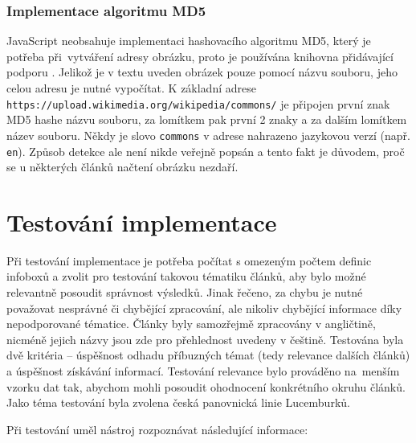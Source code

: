 \subsection{Implementace algoritmu MD5}
JavaScript neobsahuje implementaci hashovacího algoritmu MD5, který je potřeba při~vytváření adresy obrázku, proto je používána knihovna přidávající podporu \cite{md5} \cite{imageurl}. Jelikož je v textu uveden obrázek pouze pomocí názvu souboru, jeho celou adresu je nutné vypočítat. K základní adrese \texttt{https://upload.wikimedia.org/wikipedia/commons/} je připojen první znak MD5 hashe názvu souboru, za lomítkem pak první 2 znaky a za dalším lomítkem název souboru. Někdy je slovo \texttt{commons} v adrese nahrazeno jazykovou verzí (např. \texttt{en}). Způsob detekce ale není nikde veřejně popsán a tento fakt je důvodem, proč se u některých článků načtení obrázku nezdaří.

\chapter{Testování implementace}
Při testování implementace je potřeba počítat s omezeným počtem definic infoboxů a zvolit pro testování takovou tématiku článků, aby bylo možné relevantně posoudit správnost výsledků. Jinak řečeno, za chybu je nutné považovat nesprávné či chybějící zpracování, ale nikoliv chybějící informace díky nepodporované tématice. Články byly samozřejmě zpracovány v angličtině, nicméně jejich názvy jsou zde pro přehlednost uvedeny v češtině. Testována byla dvě kritéria -- úspěšnost odhadu příbuzných témat (tedy relevance dalších článků) a úspěšnost získávání informací. Testování relevance bylo prováděno na~menším vzorku dat tak, abychom mohli posoudit ohodnocení konkrétního okruhu článků. Jako téma testování byla zvolena česká panovnická linie Lucemburků. 

Při testování uměl nástroj rozpoznávat následující informace:

